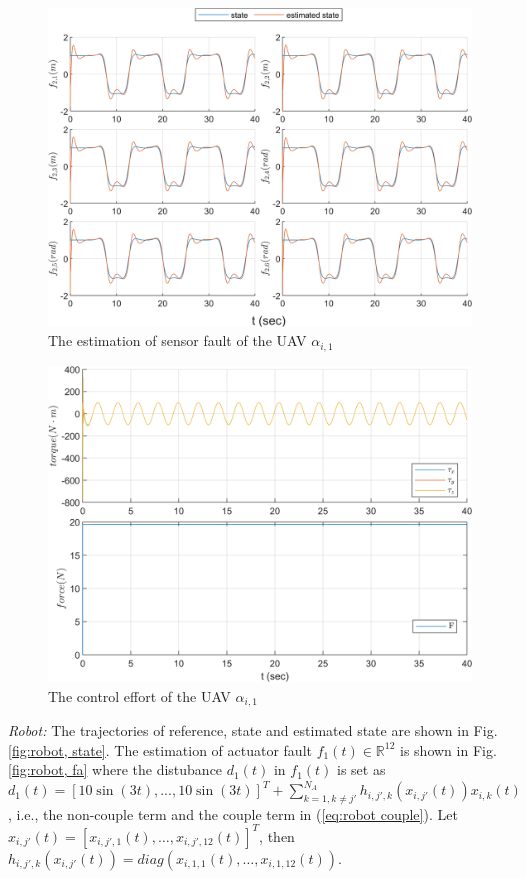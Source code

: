 \documentclass{ieeeaccess}
\begin{document}
\begin{figure}[htbp]
    \centering
    \includegraphics[scale=.57]{fig/uav (3).png}\caption{The estimation of sensor fault of the UAV $\alpha_{i,1}$}%
    \label{fig:UAV, fs}
\end{figure}
\begin{figure}[htbp]
    \centering
    \includegraphics[scale=.57]{fig/uav (4).png}\caption{The control effort of the UAV $\alpha_{i,1}$}%
    \label{fig:UAV, control}
\end{figure}

\textit{Robot:}
The trajectories of reference, state and estimated state are shown in Fig. \ref{fig:robot, state}.
The estimation of actuator fault $f_1(t)\in\mathbb{R}^{12}$ is shown in Fig. \ref{fig:robot, fa} where the distubance $d_1(t)$ in $f_1(t)$ is set as $d_1(t) = [10\sin(3t),...,10\sin(3t)]^T + \sum_{k = 1, k \neq j'}^{N_A}h_{i, j', k}(x_{i, j'}(t))x_{i, k}(t)$, i.e., the non-couple term and the couple term in (\ref{eq:robot couple}). Let $x_{i, j'}(t) = [x_{i, j', 1}(t)\mathbin{,}\dots\mathbin{,}x_{i, j', 12}(t)]^T$, then $h_{i, j', k}(x_{i, j'}(t)) = diag(x_{i, 1, 1}(t)\mathbin{,}\dots\mathbin{,}x_{i, 1, 12}(t))$.
\end{document}
